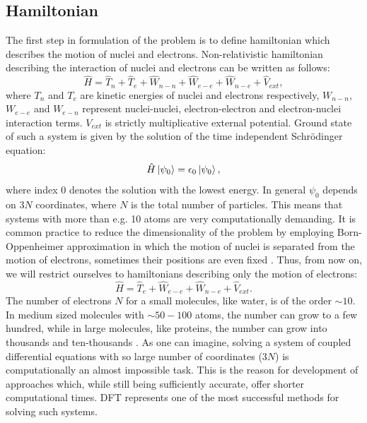 \documentclass[openany, longbibliography,slovene,a4paper,12pt]{article}
\begin{document}
\subsection{Hamiltonian}
The first step in formulation of the problem is to define hamiltonian which
describes the motion of nuclei and electrons. Non-relativistic hamiltonian
describing the interaction of  nuclei and electrons can be written as follows:
\begin{equation} \label{full_hamiltonian}
\hat H= \hat T_n + \hat  T_e + \hat  W_{n-n} + \hat W_{e-e} + \hat W_{n-e} + \hat V_{ext},
\end{equation}
where $T_n$ and $T_e$ are kinetic energies of nuclei and electrons respectively,
$W_{n-n}$, $W_{e-e}$ and $W_{e-n}$ represent nuclei-nuclei, electron-electron
and electron-nuclei interaction terms. $V_{ext}$ is strictly multiplicative
external potential. Ground state of such a system is given by the solution of
the time independent Schr{\"o}dinger equation:
\begin{equation} \label{ham_solution}
\hat H \ket { \psi_0 } = \epsilon_0 \ket{ \psi_0 },
\end{equation} 
where index $0$ denotes the solution with the lowest energy. In general $\psi_0$
depends on $3N$ coordinates, where $N$ is the total number of particles. This means
that systems with more than e.g. 10 atoms are very computationally
demanding. It is common practice to reduce the dimensionality of the problem by employing
Born-Oppenheimer approximation in which the motion of nuclei is separated from
the motion of electrons, sometimes their positions are even fixed
\cite{advanced_course, nobel_lecture}. Thus, from now on, we will
restrict ourselves to hamiltonians describing only the motion of electrons:
\begin{equation} \label{electron_hamiltonian}
\hat H=  \hat  T_e  + \hat W_{e-e} + \hat W_{n-e} + \hat V_{ext}.
\end{equation}
The number of electrons $N$ for a small molecules, like water, is of the order
$\sim 10$. In medium sized molecules with $\sim 50-100$ atoms, the number can
grow to a few hundred, while in large molecules, like proteins, the number can
grow into thousands and ten-thousands \cite{ab_initio_nmr_spect_molec}. As one can imagine, solving a system of
coupled differential equations with so large number of coordinates ($3N$) is
computationally an almost impossible task.
This is the reason for development of approaches which, while still being
sufficiently accurate, offer shorter computational times. DFT represents one of
the most successful methods for solving such systems.
\end{document}
